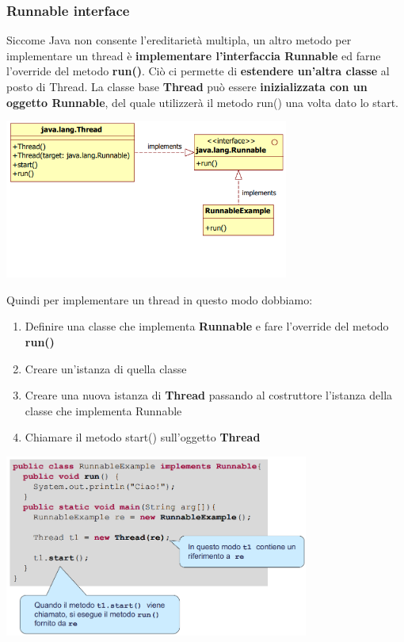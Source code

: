 \documentclass[12pt]{article}
\begin{document}
\subsubsection{Runnable interface}
Siccome Java non consente l'ereditarietà multipla, un altro metodo per implementare un thread è \textbf{implementare l'interfaccia Runnable} ed farne l'override del metodo \textbf{run()}. Ciò ci permette di \textbf{estendere un'altra classe} al posto di Thread. La classe base \textbf{Thread} può essere \textbf{inizializzata con un oggetto Runnable}, del quale utilizzerà il metodo run() una volta dato lo start.
\begin{center}
    \includegraphics[width = 0.70\textwidth]{Images/69.PNG}
\end{center}
Quindi per implementare un thread in questo modo dobbiamo:
\begin{enumerate}
    \item Definire una classe che implementa \textbf{Runnable} e fare l'override del metodo \textbf{run()}
    \item Creare un'istanza di quella classe
    \item Creare una nuova istanza di \textbf{Thread} passando al costruttore l'istanza della classe che implementa Runnable
    \item Chiamare il metodo start() sull'oggetto \textbf{Thread}
\end{enumerate}
\begin{center}
    \includegraphics[width = 0.75\textwidth]{Images/70.PNG}
\end{center}
\end{document}
